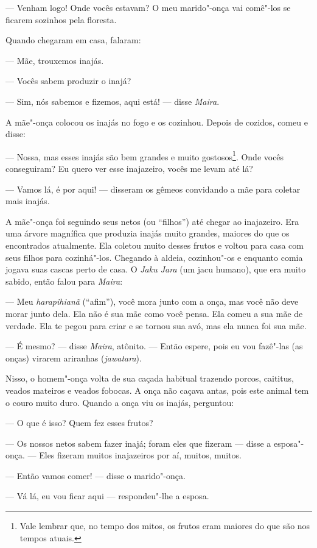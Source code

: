 --- Venham logo! Onde vocês estavam? O meu marido"-onça vai comê"-los se
ficarem sozinhos pela floresta.

Quando chegaram em casa, falaram:

--- Mãe, trouxemos inajás.

--- Vocês sabem produzir o inajá?

--- Sim, nós sabemos e fizemos, aqui está! --- disse \emph{Maira}.

A mãe"-onça colocou os inajás no fogo e os cozinhou. Depois de cozidos,
comeu e disse:

--- Nossa, mas esses inajás são bem grandes e muito gostosos\footnote{Vale
  lembrar que, no tempo dos mitos, os frutos eram maiores do que são nos
  tempos atuais.}. Onde vocês conseguiram? Eu quero ver esse inajazeiro,
vocês me levam até lá?

--- Vamos lá, é por aqui! --- disseram os gêmeos convidando a mãe para
coletar mais inajás\emph{.}

A mãe"-onça foi seguindo seus netos (ou ``filhos'') até chegar ao
inajazeiro. Era uma árvore magnífica que produzia inajás muito grandes,
maiores do que os encontrados atualmente. Ela coletou muito desses
frutos e voltou para casa com seus filhos para cozinhá"-los. Chegando à
aldeia, cozinhou"-os e enquanto comia jogava suas cascas perto de casa. O
\emph{Jaku Jara} (um jacu humano), que era muito sabido, então falou
para \emph{Maira}:

--- Meu \emph{harapihianã} (``afim''), você mora junto com a onça, mas você
não deve morar junto dela. Ela não é sua mãe como você pensa. Ela comeu
a sua mãe de verdade. Ela te pegou para criar e se tornou sua avó, mas
ela nunca foi sua mãe.

--- É mesmo? --- disse \emph{Maira}, atônito. --- Então espere, pois eu vou
fazê"-las (as onças) virarem ariranhas (\emph{jawatara}).

Nisso, o homem"-onça volta de sua caçada habitual trazendo porcos,
caititus, veados mateiros e veados fobocas. A onça não caçava antas,
pois este animal tem o couro muito duro. Quando a onça viu os inajás,
perguntou:

--- O que é isso? Quem fez esses frutos?

--- Os nossos netos sabem fazer inajá; foram eles que fizeram --- disse a
esposa"-onça. --- Eles fizeram muitos inajazeiros por aí, muitos, muitos.

--- Então vamos comer! --- disse o marido"-onça.

--- Vá lá, eu vou ficar aqui --- respondeu"-lhe a esposa.

